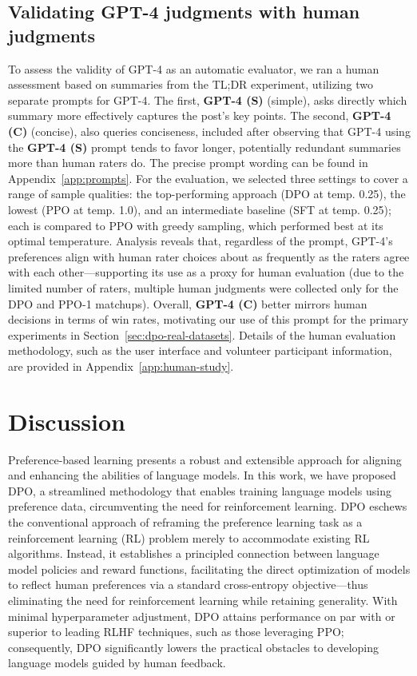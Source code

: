 \subsection{Validating GPT-4 judgments with human judgments}
\label{sec:human-judgments}

To assess the validity of GPT-4 as an automatic evaluator, we ran a human assessment based on summaries from the TL;DR experiment, utilizing two separate prompts for GPT-4. The first, \textbf{GPT-4 (S)} (simple), asks directly which summary more effectively captures the post’s key points. The second, \textbf{GPT-4 (C)} (concise), also queries conciseness, included after observing that GPT-4 using the \textbf{GPT-4 (S)} prompt tends to favor longer, potentially redundant summaries more than human raters do. The precise prompt wording can be found in Appendix~\ref{app:prompts}. For the evaluation, we selected three settings to cover a range of sample qualities: the top-performing approach (DPO at temp. 0.25), the lowest (PPO at temp. 1.0), and an intermediate baseline (SFT at temp. 0.25); each is compared to PPO with greedy sampling, which performed best at its optimal temperature. Analysis reveals that, regardless of the prompt, GPT-4’s preferences align with human rater choices about as frequently as the raters agree with each other—supporting its use as a proxy for human evaluation (due to the limited number of raters, multiple human judgments were collected only for the DPO and PPO-1 matchups). Overall, \textbf{GPT-4 (C)} better mirrors human decisions in terms of win rates, motivating our use of this prompt for the primary experiments in Section~\ref{sec:dpo-real-datasets}. Details of the human evaluation methodology, such as the user interface and volunteer participant information, are provided in Appendix~\ref{app:human-study}.

\section{Discussion}
Preference-based learning presents a robust and extensible approach for aligning and enhancing the abilities of language models. In this work, we have proposed DPO, a streamlined methodology that enables training language models using preference data, circumventing the need for reinforcement learning. DPO eschews the conventional approach of reframing the preference learning task as a reinforcement learning (RL) problem merely to accommodate existing RL algorithms. Instead, it establishes a principled connection between language model policies and reward functions, facilitating the direct optimization of models to reflect human preferences via a standard cross-entropy objective—thus eliminating the need for reinforcement learning while retaining generality. With minimal hyperparameter adjustment, DPO attains performance on par with or superior to leading RLHF techniques, such as those leveraging PPO; consequently, DPO significantly lowers the practical obstacles to developing language models guided by human feedback.

